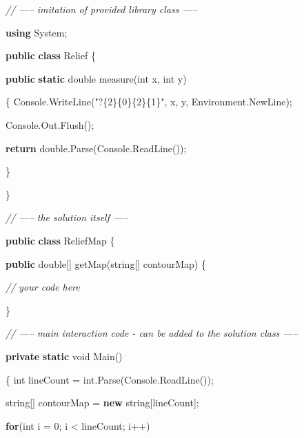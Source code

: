 \documentclass[]{article}
\newenvironment{Shaded}{}{}
\newcommand{\CommentTok}[1]{\textcolor[rgb]{0.38,0.63,0.69}{\textit{#1}}}
\newcommand{\DataTypeTok}[1]{\textcolor[rgb]{0.56,0.13,0.00}{#1}}
\newcommand{\DecValTok}[1]{\textcolor[rgb]{0.25,0.63,0.44}{#1}}
\newcommand{\FunctionTok}[1]{\textcolor[rgb]{0.02,0.16,0.49}{#1}}
\newcommand{\KeywordTok}[1]{\textcolor[rgb]{0.00,0.44,0.13}{\textbf{#1}}}
\newcommand{\NormalTok}[1]{#1}
\newcommand{\StringTok}[1]{\textcolor[rgb]{0.25,0.44,0.63}{#1}}
\begin{document}
\begin{Shaded}
\begin{Highlighting}[]

\CommentTok{// ----- imitation of provided library class -----}

\KeywordTok{using}\NormalTok{ System;}

\KeywordTok{public} \KeywordTok{class}\NormalTok{ Relief \{}

    \KeywordTok{public} \KeywordTok{static} \DataTypeTok{double} \FunctionTok{measure}\NormalTok{(}\DataTypeTok{int}\NormalTok{ x, }\DataTypeTok{int}\NormalTok{ y)}

\NormalTok{    \{   Console.}\FunctionTok{WriteLine}\NormalTok{(}\StringTok{"?\{2\}\{0\}\{2\}\{1\}"}\NormalTok{, x, y, Environment.}\FunctionTok{NewLine}\NormalTok{);}

\NormalTok{        Console.}\FunctionTok{Out}\NormalTok{.}\FunctionTok{Flush}\NormalTok{();}

        \KeywordTok{return} \DataTypeTok{double}\NormalTok{.}\FunctionTok{Parse}\NormalTok{(Console.}\FunctionTok{ReadLine}\NormalTok{());}

\NormalTok{    \}}

\NormalTok{\}}

\CommentTok{// ----- the solution itself -----}

\KeywordTok{public} \KeywordTok{class}\NormalTok{ ReliefMap \{}

    \KeywordTok{public} \DataTypeTok{double}\NormalTok{[] }\FunctionTok{getMap}\NormalTok{(}\DataTypeTok{string}\NormalTok{[] contourMap) \{}

        \CommentTok{// your code here}

\NormalTok{    \}}

\CommentTok{// ----- main interaction code - can be added to the solution class -----}

    \KeywordTok{private} \KeywordTok{static} \DataTypeTok{void} \FunctionTok{Main}\NormalTok{()}

\NormalTok{    \{   }\DataTypeTok{int}\NormalTok{ lineCount = }\DataTypeTok{int}\NormalTok{.}\FunctionTok{Parse}\NormalTok{(Console.}\FunctionTok{ReadLine}\NormalTok{());}

        \DataTypeTok{string}\NormalTok{[] contourMap = }\KeywordTok{new} \DataTypeTok{string}\NormalTok{[lineCount];}

        \KeywordTok{for}\NormalTok{(}\DataTypeTok{int}\NormalTok{ i = }\DecValTok{0}\NormalTok{; i < lineCount; i++)}


\end{Highlighting}
\end{Shaded}
\end{document}
